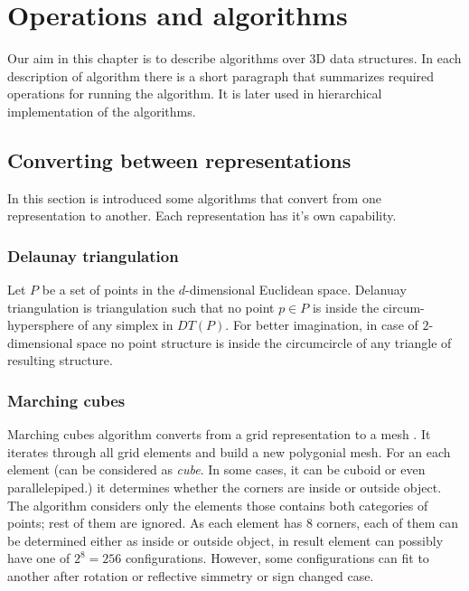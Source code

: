 \chapter{Operations and algorithms}

\label{chap:op_al}

Our aim in this chapter is to describe algorithms over 3D data structures. In each description of
algorithm there is a short paragraph that summarizes required operations for running the algorithm.
It is later used in hierarchical implementation of the algorithms.

\section{Converting between representations}

In this section is introduced some algorithms that convert from one representation to another. Each 
representation has it's own capability.

\subsection{Delaunay triangulation}

Let $P$ be a set of points in the $d$-dimensional Euclidean space.
Delanuay triangulation is triangulation such that no point $p \in P$ is inside the circum-hypersphere
of any simplex in $DT(P)$. For better imagination, in case of $2$-dimensional space no point
structure is inside the circumcircle of any triangle of resulting structure.

\subsection{Marching cubes}
\label{sub:march}

Marching cubes algorithm converts from a grid representation to a mesh \cite{Lorensen1987}. It iterates through
all grid elements and build a new polygonial mesh. For an each element (can be considered as \emph{cube}.
In some cases, it can be cuboid or even parallelepiped.)
it determines whether the corners are inside or outside object. The algorithm considers only the elements
those contains both categories of points; rest of them are ignored. As each element has 8 corners,
each of them can be determined either as inside or outside object, in result element can possibly
have one of $2^8 = 256$ configurations. However, some configurations can fit to another after rotation
or reflective simmetry or sign changed case.\\


